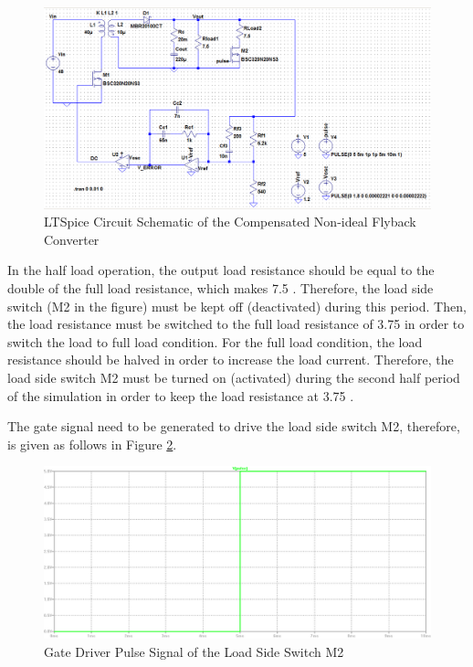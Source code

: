 \begin{figure}[H]
\begin{center}
\includegraphics[width=1\textwidth]{comp_simulations/schematic_HF.png}
\caption{LTSpice Circuit Schematic of the Compensated Non-ideal Flyback Converter}
\label{com:schematic_HF}
\end{center}
\end{figure}

In the half load operation, the output load resistance should be equal to the double of the full load resistance, which makes 7.5 \ohm. Therefore, the load side switch (M2 in the figure) must be kept off (deactivated) during this period. Then, the load resistance must be switched to the full load resistance of 3.75 \ohm in order to switch the load to full load condition. For the full load condition, the load resistance should be halved in order to increase the load current. Therefore, the load side switch M2 must be turned on (activated) during the second half period of the simulation in order to keep the load resistance at 3.75 \ohm.

The gate signal need to be generated to drive the load side switch M2, therefore, is given as follows in Figure \ref{com:pulse_HF}.

\begin{figure}[H]
\begin{center}
\includegraphics[width=1\textwidth]{comp_simulations/pulse_HF.png}
\caption{Gate Driver Pulse Signal of the Load Side Switch M2}
\label{com:pulse_HF}
\end{center}
\end{figure}

